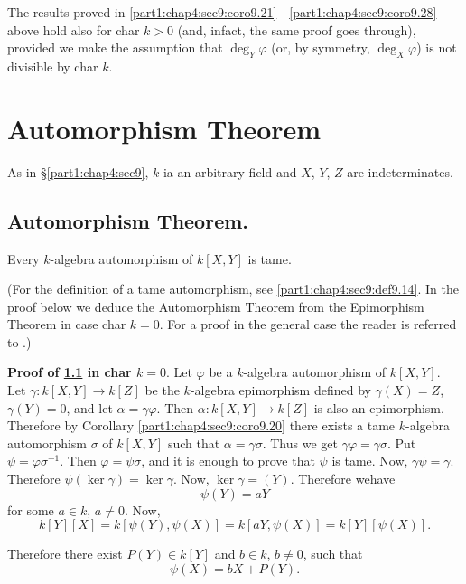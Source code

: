 \begin{remark}\label{part1:chap4:sec9:rem9.29}
  The results proved in \ref{part1:chap4:sec9:coro9.21} - \ref{part1:chap4:sec9:coro9.28} above hold also for char $k > 0$ (and, infact, the same proof goes through), provided we make the assumption that $\deg_Y \varphi$ (or, by symmetry, $\deg_X \varphi$) is not divisible by char $k$. 
\end{remark}

\section{Automorphism Theorem}\label{part1:chap4:sec10}

As in \S \ref{part1:chap4:sec9}, $k$ ia an arbitrary field and $X$, $Y$, $Z$ are indeterminates.

\subsection{Automorphism Theorem.} \label{part1:chap4:sec10:ss10.1}
Every $k$-algebra automorphism of $k[X, Y]$ is tame.

(For the definition of a tame automorphism, see \ref{part1:chap4:sec9:def9.14}. In the proof below we deduce the Automorphism Theorem from the Epimorphism Theorem in case char $k=0$. For a proof in the general case the reader is referred to \cite{5}.)

\medskip
\noindent \textbf{Proof of \ref{part1:chap4:sec10:ss10.1} in char $k=0$}. Let $\varphi$ be a $k$-algebra automorphism of $k[X, Y]$. Let $\gamma : k[X, Y]\to k[Z]$ be the $k$-algebra epimorphism defined by $\gamma(X)= Z$, $\gamma(Y)=0$, and let $\alpha = \gamma \varphi$. Then $\alpha : k[X, Y] \to k[Z]$ is also an epimorphism. Therefore by Corollary \ref{part1:chap4:sec9:coro9.20} there exists a tame $k$-algebra automorphism $\sigma$ of $k[X, Y]$ such that $\alpha = \gamma \sigma$. Thus we get $\gamma \varphi = \gamma \sigma$. Put $\psi = \varphi \sigma^{-1}$. Then $\varphi= \psi \sigma$, and it is enough to prove that $\psi$ is tame. Now, $\gamma \psi= \gamma$. Therefore $\psi (\ker \gamma) = \ker \gamma$. Now, $\ker \gamma = (Y)$. Therefore we\pageoriginale have
\begin{equation*}
  \psi (Y) = a Y\tag{10.1.1}\label{part1:chap4:sec10:eq10.1.1}
\end{equation*}
for some $a \in k$, $a \neq 0$. Now,
$$
k[Y][X]= k[\psi (Y), \psi (X)]= k[aY , \psi (X)]= k[Y][\psi (X)].
$$

Therefore there exist $P(Y) \in k [Y]$ and $b \in k$, $b \neq 0$, such that 
\begin{equation*}
  \psi (X) = bX + P(Y).\tag{10.1.2}\label{part1:chap4:sec10:eq10.1.2}
\end{equation*}

